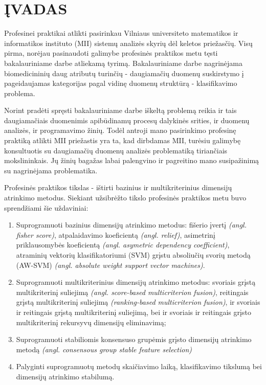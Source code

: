 \section*{ĮVADAS}

Profesinei praktikai atlikti pasirinkau Vilniaus universiteto matematikos ir 
informatikos instituto (MII) sistemų analizės skyrių dėl keletos priežasčių. Visų pirma, norėjau pasinaudoti 
galimybe profesinės praktikos metu tęsti bakalauriniame darbe atliekamą tyrimą. 
Bakalauriniame darbe nagrinėjama biomedicininių daug atributų turinčių - 
daugiamačių duomenų suskirstymo į pageidaujamas kategorijas pagal vidinę duomenų
struktūrą - klasifikavimo problema.

Norint pradėti spręsti bakalauriniame darbe iškeltą problemą reikia ir tais 
daugiamačiais duomenimis 
apibūdinamų procesų dalykinės srities, ir duomenų analizės, ir programavimo 
žinių. Todėl antroji mano pasirinkimo profesinę praktiką atlikti MII priežastis yra ta, kad
dirbdamas MII, turėsiu galimybę konsultuotis su daugiamačių 
duomenų analizės problematiką tiriančiais mokslininkais. Jų žinių bagažas
labai palengvino ir pagreitino mano susipažinimą su nagrinėjama problematika.


Profesinės praktikos tikslas - ištirti bazinius ir multikriterinius dimensijų atrinkimo metodus.
Siekiant užsibrėžto tikslo profesinės praktikos metu buvo sprendžiami šie 
uždaviniai:
\begin{enumerate}
  \item Suprogramuoti bazinius dimensijų atrinkimo metodus: 
fišerio įvertį \textit{(angl. fisher score)}, 
atpalaidavimo koeficientą \textit{(angl. relief)},
asimetrinį priklausomybės koeficientą \textit{(angl. asymetric
dependency coefficient)},  atraminių vektorių klasifikatoriumi (SVM) grįstu absoliučių 
svorių metodą (AW-SVM) \textit{(angl. absolute weight support vector machines)}.
  \item Suprogramuoti multikriterinius dimensijų atrinkimo metodus\cite{5611484}: svoriais 
grįstą multikriterinį suliejimą \textit{(angl. score-based multicriterion fusion)},
reitingais grįstą multikriterinį suliejimą \textit{(ranking-based multicriterion fusion)},
ir svoriais ir reitingais grįstą multikriterinį suliejimą, bei ir svoriais ir
reitingais grįsto multikriterinį rekursyvų dimensijų eliminavimą;
  \item Suprogramuoti  stabiliomis konsensuso grupėmis grįsto dimensijų atrinkimo
metodą\cite{loscalzo2009consensus} \textit{(angl. consensous group
 stable feature selection)}
  \item Palyginti suprogramuotų metodų skaičiavimo laiką, klasifikavimo tikslumą 
bei dimensijų atrinkimo stabilumą.
\end{enumerate}

